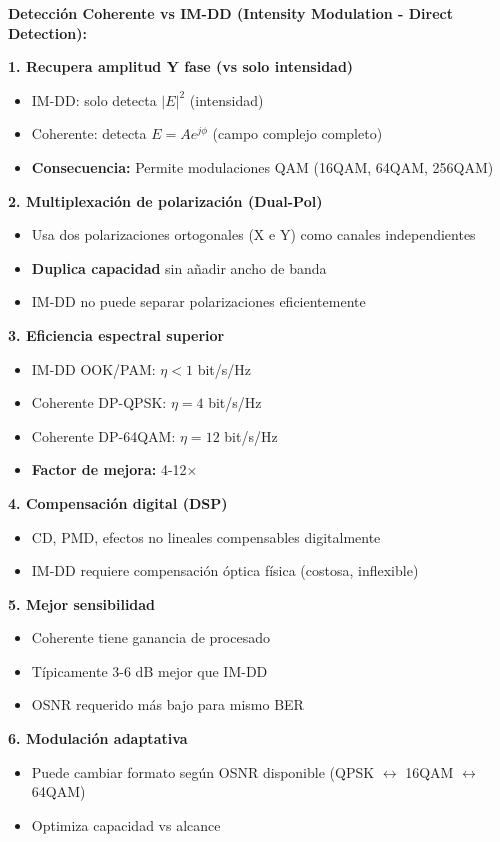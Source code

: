 \documentclass[a4paper,10pt]{article}
\begin{document}
\textbf{Detección Coherente vs IM-DD (Intensity Modulation - Direct Detection):}

\textbf{1. Recupera amplitud Y fase (vs solo intensidad)}
\begin{itemize}
    \item IM-DD: solo detecta $|E|^2$ (intensidad)
    \item Coherente: detecta $E = A e^{j\phi}$ (campo complejo completo)
    \item \textbf{Consecuencia:} Permite modulaciones QAM (16QAM, 64QAM, 256QAM)
\end{itemize}

\textbf{2. Multiplexación de polarización (Dual-Pol)}
\begin{itemize}
    \item Usa dos polarizaciones ortogonales (X e Y) como canales independientes
    \item \textbf{Duplica capacidad} sin añadir ancho de banda
    \item IM-DD no puede separar polarizaciones eficientemente
\end{itemize}

\textbf{3. Eficiencia espectral superior}
\begin{itemize}
    \item IM-DD OOK/PAM: $\eta < 1$ bit/s/Hz
    \item Coherente DP-QPSK: $\eta = 4$ bit/s/Hz
    \item Coherente DP-64QAM: $\eta = 12$ bit/s/Hz
    \item \textbf{Factor de mejora:} 4-12×
\end{itemize}

\textbf{4. Compensación digital (DSP)}
\begin{itemize}
    \item CD, PMD, efectos no lineales compensables digitalmente
    \item IM-DD requiere compensación óptica física (costosa, inflexible)
\end{itemize}

\textbf{5. Mejor sensibilidad}
\begin{itemize}
    \item Coherente tiene ganancia de procesado
    \item Típicamente 3-6 dB mejor que IM-DD
    \item OSNR requerido más bajo para mismo BER
\end{itemize}

\textbf{6. Modulación adaptativa}
\begin{itemize}
    \item Puede cambiar formato según OSNR disponible (QPSK $\leftrightarrow$ 16QAM $\leftrightarrow$ 64QAM)
    \item Optimiza capacidad vs alcance
\end{itemize}
\end{document}
